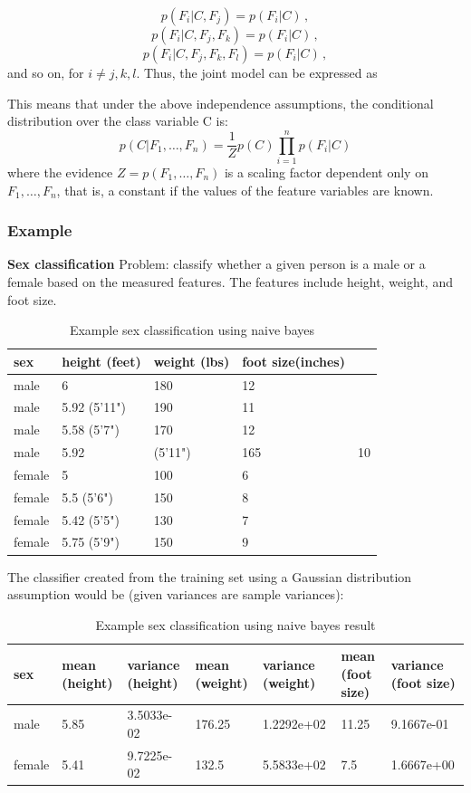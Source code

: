 \documentclass[12pt]{book}
\begin{document}
$$ p(F_i \vert C, F_j) = p(F_i \vert C)\,, $$
$$ p(F_i \vert C, F_j,F_k) = p(F_i \vert C)\,, $$
$$ p(F_i \vert C, F_j,F_k,F_l) = p(F_i \vert C)\,, $$
and so on, for  $i\ne j,k,l$. Thus, the joint model can be expressed as

This means that under the above independence assumptions, the conditional distribution over the class variable C is:
$$ p(C \vert F_1,\dots,F_n) = \frac{1}{Z}  p(C) \prod_{i=1}^n p(F_i \vert C)$$
where the evidence $Z = p(F_1, \dots, F_n)$ is a scaling factor dependent only on $F_1,\dots,F_n$, that is, a constant if the values of the feature variables are known.


\subsubsection{Example}

\textbf{Sex classification}
Problem: classify whether a given person is a male or a female based on the measured features. The features include height, weight, and foot size.

\begin{longtable}[c]{ |p{3cm}|p{3cm}|p{3cm}|p{3cm}|  }
  \caption{Example sex classification using naive bayes\label{tab:sex_classification_naive_bayes}}\\
  \hline
  sex & height (feet) & weight (lbs) & foot size(inches)\\
  \hline
  \endhead
  male & 6 & 180 & 12\\
  \hline
  male & 5.92 (5'11") & 190 & 11\\
  \hline
  male & 5.58 (5'7") & 170 & 12\\
  \hline
  male & 5.92 & (5'11") & 165 & 10\\
  \hline
  female & 5 & 100 & 6\\
  \hline
  female & 5.5 (5'6") & 150 & 8\\
  \hline
  female & 5.42 (5'5") & 130 & 7\\
  \hline
  female & 5.75 (5'9") & 150 & 9\\
  \hline
\end{longtable}

The classifier created from the training set using a Gaussian distribution assumption would be (given variances are sample variances):

\begin{longtable}[c]{ |p{2cm}|p{2cm}|p{2cm}|p{2cm}|p{2cm}|p{2cm}|p{2cm}|  }
  \caption{Example sex classification using naive bayes result \label{tab:sex_classification_naive_bayes_res}}\\
  \hline
  sex & mean (height) & variance (height) & mean (weight) & variance (weight) & mean (foot size) & variance (foot size)\\
  \hline
  \endhead
  male & 5.85 & 3.5033e-02 & 176.25 & 1.2292e+02 & 11.25 & 9.1667e-01\\
  \hline
  female & 5.41 & 9.7225e-02 & 132.5 & 5.5833e+02 & 7.5 & 1.6667e+00\\
  \hline
\end{longtable}
 
\end{document}
